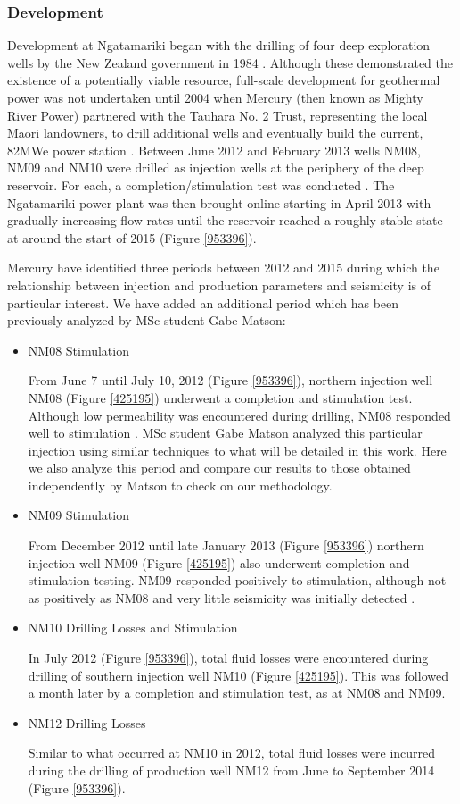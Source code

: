 \subsubsection{Development}
Development at Ngatamariki began with the drilling of four deep exploration wells by the New Zealand government in 1984 \citep{Clearwater_2015}. Although these demonstrated the existence of a potentially viable resource, full-scale development for geothermal power was not undertaken until 2004 when Mercury (then known as Mighty River Power) partnered with the Tauhara No. 2 Trust, representing the local Maori landowners, to drill additional wells and eventually build the current, 82MWe power station \citep{Clearwater_2015}. Between June 2012 and February 2013 wells NM08, NM09 and NM10 were drilled as injection wells at the periphery of the deep reservoir. For each, a completion\slash{stimulation} test was conducted \citep{Clearwater_2015}. The Ngatamariki power plant was then brought online starting in April 2013 with gradually increasing flow rates until the reservoir reached a roughly stable state at around the start of 2015 (Figure \ref{953396}).

Mercury have identified three periods between 2012 and 2015 during which the relationship between injection and production parameters and seismicity is of particular interest. We have added an additional period which has been previously analyzed by MSc student Gabe Matson:
\begin{itemize}
  \item{NM08 Stimulation}
  
  From June 7 until July 10, 2012 (Figure \ref{953396}), northern injection well NM08 (Figure \ref{425195}) underwent a completion and stimulation test. Although low permeability was encountered during drilling, NM08 responded well to stimulation \citep{Clearwater_2015}. MSc student Gabe Matson analyzed this particular injection using similar techniques to what will be detailed in this work. Here we also analyze this period and compare our results to those obtained independently by Matson to check on our methodology.
  \item{NM09 Stimulation}
  
  From December 2012 until late January 2013 (Figure \ref{953396}) northern injection well NM09 (Figure \ref{425195}) also underwent completion and stimulation testing. NM09 responded positively to stimulation, although not as positively as NM08 and very little seismicity was initially detected \citep{Clearwater_2015}.
  \item{NM10 Drilling Losses and Stimulation}
  
  In July 2012 (Figure \ref{953396}), total fluid losses were encountered during drilling of southern injection well NM10 (Figure \ref{425195}). This was followed a month later by a completion and stimulation test, as at NM08 and NM09.
  \item{NM12 Drilling Losses}
  
  Similar to what occurred at NM10 in 2012, total fluid losses were incurred during the drilling of production well NM12 from June to September 2014 (Figure \ref{953396}).
\end{itemize}

